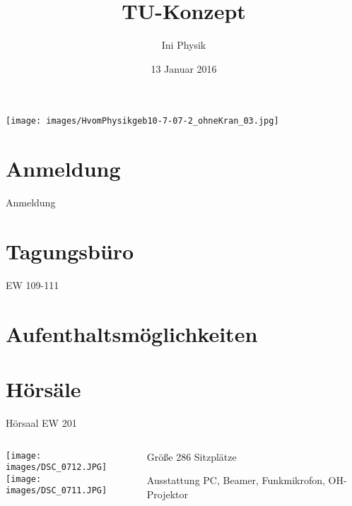 \documentclass[compress,]{beamer}
\title[TU-Konzept]{TU-Konzept}
\author{Ini Physik}
\institute[TU Berlin]
\begin{document}
\subject{Konzept an der TU}
\date{13 Januar 2016}

\begin{frame}
\begin{center}
\texttt{[image: images/HvomPhysikgeb10-7-07-2\_ohneKran\_03.jpg]}
\end{center}
\titlepage
\vspace{-2.5cm}
\end{frame}


\frame{\tableofcontents}

\section{Anmeldung}
\begin{frame}{Anmeldung}
\end{frame}


\section{Tagungsbüro}
\begin{frame}{EW 109-111}
\end{frame}


\section{Aufenthaltsmöglichkeiten}
\begin{frame}
\end{frame}


\section{Hörsäle}
\begin{frame}{Hörsaal EW 201}
  \begin{columns}[onlytextwidth]
    \begin{column}{0.5\textwidth}
      \texttt{[image: images/DSC\_0712.JPG]}\\
      \texttt{[image: images/DSC\_0711.JPG]}
    \end{column}
    \begin{column}{0.4\textwidth}
      \begin{block}{Größe}
        286 Sitzplätze
      \end{block}
      \vspace{1cm}
      \begin{block}{Ausstattung}
        PC, Beamer, Funkmikrofon, OH-Projektor
      \end{block}
    \end{column}
  \end{columns}
\end{frame}
\end{document}
